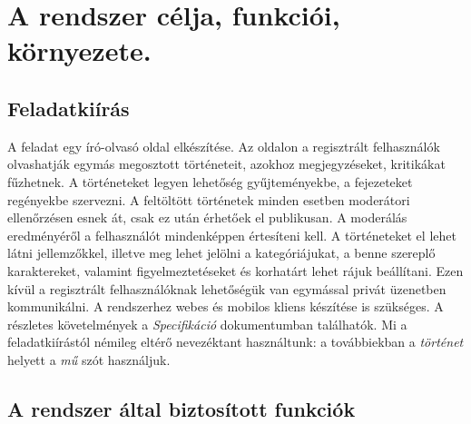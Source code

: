 \section{A rendszer célja, funkciói, környezete.}

\subsection{Feladatkiírás}
A feladat egy író-olvasó oldal elkészítése. Az oldalon a regisztrált felhasználók olvashatják egymás megosztott történeteit, azokhoz megjegyzéseket, kritikákat fűzhetnek. A történeteket legyen lehetőség gyűjteményekbe, a fejezeteket regényekbe szervezni. A feltöltött történetek minden esetben moderátori ellenőrzésen esnek át, csak ez után érhetőek el publikusan. A moderálás eredményéről a felhasználót mindenképpen értesíteni kell. A történeteket el lehet látni jellemzőkkel, illetve meg lehet jelölni a kategóriájukat, a benne szereplő karaktereket, valamint figyelmeztetéseket és korhatárt lehet rájuk beállítani. Ezen kívül a regisztrált felhasználóknak lehetőségük van egymással privát üzenetben kommunikálni. A rendszerhez webes és mobilos kliens készítése is szükséges.
A részletes követelmények a \textit{Specifikáció} dokumentumban találhatók.
Mi a feladatkiírástól némileg eltérő nevezéktant használtunk: a továbbiekban a \textit{történet} helyett a \textit{mű} szót használjuk.

\subsection{A rendszer által biztosított funkciók}

